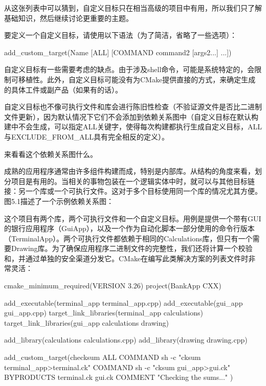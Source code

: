 从这张列表中可以猜到，自定义目标只在相当高级的项目中有用，所以我们只了解基础知识，然后继续讨论更重要的主题。

要定义一个自定义目标，请使用以下语法（为了简洁，省略了一些选项）：

\begin{shell}
add_custom_target(Name [ALL] [COMMAND command2 [args2...] ...])
\end{shell}

自定义目标有一些需要考虑的缺点。由于涉及shell命令，可能是系统特定的，会限制可移植性。此外，自定义目标可能没有为CMake提供直接的方式，来确定生成的具体工件或副产品（如果有的话）。

自定义目标也不像可执行文件和库会进行陈旧性检查（不验证源文件是否比二进制文件更新），因为默认情况下它们不会添加到依赖关系图中（自定义目标在默认构建中不会生成，可以指定ALL关键字，使得每次构建都执行生成自定义目标，ALL与EXCLUDE\_FROM\_ALL具有完全相反的定义）。

来看看这个依赖关系图什么。


成熟的应用程序通常由许多组件构建而成，特别是内部库。从结构的角度来看，划分项目是有用的。当相关的事物包装在一个逻辑实体中时，就可以与其他目标链接：另一个库或一个可执行文件。这对于多个目标使用同一个库的情况尤其方便。图5.1描述了一个示例依赖关系图：


这个项目有两个库，两个可执行文件和一个自定义目标。用例是提供一个带有GUI的银行应用程序（GuiApp），以及一个作为自动化脚本一部分使用的命令行版本（TerminalApp）。两个可执行文件都依赖于相同的Calculations库，但只有一个需要Drawing库。为了确保应用程序二进制文件的完整性，我们还将计算一个校验和，并通过单独的安全渠道分发它。CMake在编写此类解决方案的列表文件时非常灵活：


\begin{cmake}
cmake_minimum_required(VERSION 3.26)
project(BankApp CXX)

add_executable(terminal_app terminal_app.cpp)
add_executable(gui_app gui_app.cpp)
target_link_libraries(terminal_app calculations)
target_link_libraries(gui_app calculations drawing)

add_library(calculations calculations.cpp)
add_library(drawing drawing.cpp)

add_custom_target(checksum ALL
    COMMAND sh -c "cksum terminal_app>terminal.ck"
    COMMAND sh -c "cksum gui_app>gui.ck"
    BYPRODUCTS terminal.ck gui.ck
    COMMENT "Checking the sums..."
)
\end{cmake}

